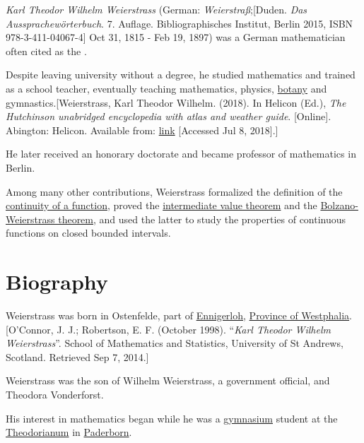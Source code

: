 \documentclass{book}
\numberwithin{equation}{section}
\begin{document}
\textit{Karl Theodor Wilhelm Weierstrass} (German: \textit{Weierstraß};[Duden. \textit{Das Aussprachewörterbuch}. 7. Auflage. Bibliographisches Institut, Berlin 2015, ISBN 978-3-411-04067-4] Oct 31, 1815 - Feb 19, 1897) was a German mathematician often cited as the .

Despite leaving university without a degree, he studied mathematics and trained as a school teacher, eventually teaching mathematics, physics, \href{https://en.wikipedia.org/wiki/Botany}{botany} and gymnastics.[Weierstrass, Karl Theodor Wilhelm. (2018). In Helicon (Ed.), \textit{The Hutchinson unabridged encyclopedia with atlas and weather guide}. [Online]. Abington: Helicon. Available from: \href{http://libezproxy.open.ac.uk/login?url=https://search.credoreference.com/content/entry/heliconhe/weierstrass_karl_theodor_wilhelm/0?institutionId=292}{link} [Accessed Jul 8, 2018].]

He later received an honorary doctorate and became professor of mathematics in Berlin.

%
Among many other contributions, Weierstrass formalized the definition of the \href{https://en.wikipedia.org/wiki/Continuous_function}{continuity of a function}, proved the \href{https://en.wikipedia.org/wiki/Intermediate_value_theorem}{intermediate value theorem} and the \href{https://en.wikipedia.org/wiki/Bolzano%E2%80%93Weierstrass_theorem}{Bolzano-Weierstrass theorem}, and used the latter to study the properties of continuous functions on closed bounded intervals.

\section{Biography}
Weierstrass was born in Ostenfelde, part of \href{https://en.wikipedia.org/wiki/Ennigerloh}{Ennigerloh}, \href{https://en.wikipedia.org/wiki/Province_of_Westphalia}{Province of Westphalia}.[O'Connor, J. J.; Robertson, E. F. (October 1998). ``\textit{Karl Theodor Wilhelm Weierstrass}''. School of Mathematics and Statistics, University of St Andrews, Scotland. Retrieved Sep 7, 2014.]

%
Weierstrass was the son of Wilhelm Weierstrass, a government official, and Theodora Vonderforst.

His interest in mathematics began while he was a \href{https://en.wikipedia.org/wiki/Gymnasium_(Germany)}{gymnasium} student at the \href{https://en.wikipedia.org/wiki/Gymnasium_Theodorianum}{Theodorianum} in \href{https://en.wikipedia.org/wiki/Paderborn}{Paderborn}.
\end{document}
